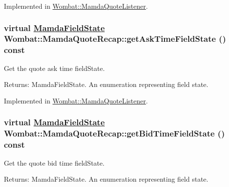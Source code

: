 Implemented in \hyperlink{classWombat_1_1MamdaQuoteListener_35f256d26e13d0dc0302c256567f54ba}{Wombat::Mamda\-Quote\-Listener}.\hypertarget{classWombat_1_1MamdaQuoteRecap_bea1b72396575311378b1b4063ab1734}{
\subsubsection[getAskTimeFieldState]{\setlength{\rightskip}{0pt plus 5cm}virtual \hyperlink{namespaceWombat_93aac974f2ab713554fd12a1fa3b7d2a}{Mamda\-Field\-State} Wombat::Mamda\-Quote\-Recap::get\-Ask\-Time\-Field\-State () const}}
\label{classWombat_1_1MamdaQuoteRecap_bea1b72396575311378b1b4063ab1734}


Get the quote ask time field\-State. 

\begin{Desc}
\item[Returns:]Mamda\-Field\-State. An enumeration representing field state. \end{Desc}


Implemented in \hyperlink{classWombat_1_1MamdaQuoteListener_355651d7e3a9641c607fa3e82ce8e833}{Wombat::Mamda\-Quote\-Listener}.\hypertarget{classWombat_1_1MamdaQuoteRecap_c5406a153ad823049ce414a442f6a25b}{
\subsubsection[getBidTimeFieldState]{\setlength{\rightskip}{0pt plus 5cm}virtual \hyperlink{namespaceWombat_93aac974f2ab713554fd12a1fa3b7d2a}{Mamda\-Field\-State} Wombat::Mamda\-Quote\-Recap::get\-Bid\-Time\-Field\-State () const}}
\label{classWombat_1_1MamdaQuoteRecap_c5406a153ad823049ce414a442f6a25b}


Get the quote bid time field\-State. 

\begin{Desc}
\item[Returns:]Mamda\-Field\-State. An enumeration representing field state. \end{Desc}


